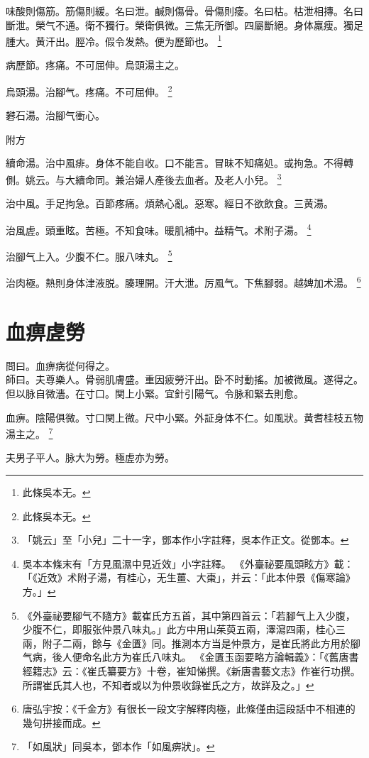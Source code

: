 味酸則傷筋。筋傷則緩。名曰泄。鹹則傷骨。骨傷則痿。名曰枯。枯泄相摶。名曰斷泄。榮气不通。衛不獨行。榮衛俱微。三焦无所御。四屬斷絕。身体羸瘦。獨足腫大。黄汗出。脛冷。假令发熱。便为歷節也。
	\footnote{
		此條吳本无。
	}

病歷節。疼痛。不可屈伸。烏頭湯主之。

烏頭湯。治腳气。疼痛。不可屈伸。
	\footnote{
		此條吳本无。
	}

礬石湯。治腳气衝心。

附方

續命湯。治中風痱。身体不能自收。口不能言。冒昧不知痛処。或拘急。不得轉側。{\scriptsize 姚云。与大續命同。兼治婦人產後去血者。及老人小兒。}
	\footnote{
		「姚云」至「小兒」二十一字，鄧本作小字註釋，吳本作正文。從鄧本。
	}

治中風。手足拘急。百節疼痛。煩熱心亂。惡寒。經日不欲飲食。三黄湯。

治風虗。頭重眩。苦極。不知食味。暖肌補中。益精气。术附子湯。
	\footnote{
		吳本本條末有「方見風濕中見近效」小字註釋。
		《外臺祕要風頭眩方》載：「《近效》术附子湯，有桂心，无生薑、大棗」，并云：「此本仲景《傷寒論》方。」
	}

治腳气上入。少腹不仁。服八味丸。
	\footnote{
		《外臺祕要腳气不隨方》載崔氏方五首，其中第四首云：「若腳气上入少腹，少腹不仁，即服张仲景八味丸。」此方中用山茱萸五兩，澤瀉四兩，桂心三兩，附子二兩，餘与《金匱》同。推測本方当是仲景方，是崔氏將此方用於腳气病，後人便命名此方为崔氏八味丸。
		《金匱玉函要略方論輯義》：「《舊唐書經籍志》云：《崔氏纂要方》十卷，崔知悌撰。《新唐書藝文志》作崔行功撰。所謂崔氏其人也，不知者或以为仲景收錄崔氏之方，故詳及之。」
	}

治肉極。熱則身体津{\khaai 液}脱。腠理開。汗大泄。厉風气。下焦腳弱。越婢加术湯。
	\footnote{
		唐弘宇按：《千金方》有很长一段文字解釋肉極，此條僅由這段話中不相連的幾句拼接而成。
	}

\chapter{血痹虗勞}

問曰。血痹病從何得之。\\
師曰。夫尊樂人。骨弱肌膚盛。重因疲勞汗出。卧不时動搖。加被微風。遂得之。但以脉自微濇。在寸口。関上小緊。宜針引陽气。令脉和緊去則愈。

血痹。陰陽俱微。寸口関上微。尺中小緊。外証身体不仁。如風狀。黄耆桂枝五物湯主之。
	\footnote{
		「如風狀」同吳本，鄧本作「如風痹狀」。
	}

夫男子平人。脉大为勞。極虗亦为勞。


